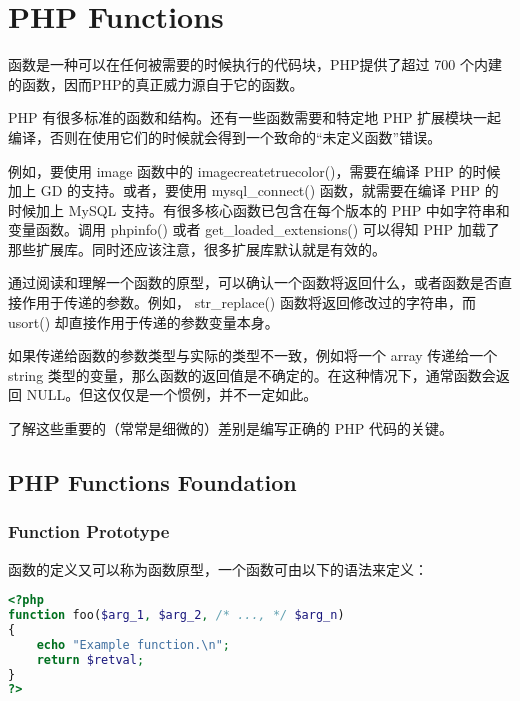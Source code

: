 \part{PHP Functions}


函数是一种可以在任何被需要的时候执行的代码块，PHP提供了超过 700 个内建的函数，因而PHP的真正威力源自于它的函数。

PHP 有很多标准的函数和结构。还有一些函数需要和特定地 PHP 扩展模块一起编译，否则在使用它们的时候就会得到一个致命的“未定义函数”错误。

例如，要使用 image 函数中的 imagecreatetruecolor()，需要在编译 PHP 的时候加上 GD 的支持。或者，要使用 mysql\_connect() 函数，就需要在编译 PHP 的时候加上 MySQL 支持。有很多核心函数已包含在每个版本的 PHP 中如字符串和变量函数。调用 phpinfo() 或者 get\_loaded\_extensions() 可以得知 PHP 加载了那些扩展库。同时还应该注意，很多扩展库默认就是有效的。

通过阅读和理解一个函数的原型，可以确认一个函数将返回什么，或者函数是否直接作用于传递的参数。例如， str\_replace() 函数将返回修改过的字符串，而 usort() 却直接作用于传递的参数变量本身。



如果传递给函数的参数类型与实际的类型不一致，例如将一个 array 传递给一个 string 类型的变量，那么函数的返回值是不确定的。在这种情况下，通常函数会返回 NULL。但这仅仅是一个惯例，并不一定如此。

了解这些重要的（常常是细微的）差别是编写正确的 PHP 代码的关键。



\chapter{PHP Functions Foundation}

\vspace{-30pt}

\section{Function Prototype}



函数的定义又可以称为函数原型，一个函数可由以下的语法来定义：

\begin{lstlisting}[language=PHP]
<?php
function foo($arg_1, $arg_2, /* ..., */ $arg_n)
{
    echo "Example function.\n";
    return $retval;
}
?>
\end{lstlisting}



